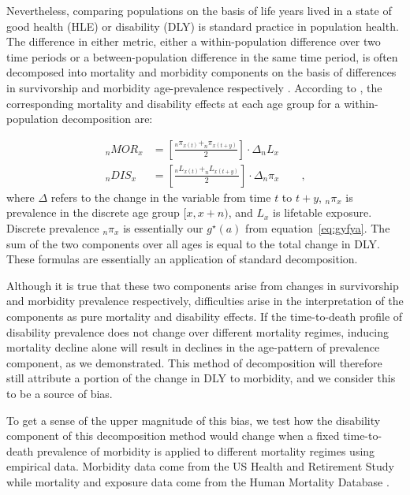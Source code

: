 \documentclass[11pt,oneside,a4paper]{article} %
\newcommand{\tc}{\quad\quad\text{,}}
\begin{document}
Nevertheless, comparing populations on the basis of life years lived in a state
of good health (HLE) or disability (DLY) is standard practice in population
health. The difference in either metric, either a within-population difference
over two time periods or a between-population difference in the same time
period, is often decomposed into mortality and morbidity components on the basis
of differences in survivorship and morbidity age-prevalence respectively
\citep{Nusselder2004,Andreev2002}. According to \citet{Nusselder2004}, the corresponding mortality and disability effects at each age group for a within-population decomposition are:

\begin{align}
	{_{n}{MOR}_{x}}&=\left [ \frac{_{n}\pi_{x\left ( t \right )} + _{n}\pi_{x\left
	( t+y \right )}  }{2}\right ]\cdot \Delta _{n}L_{x} \label{eq:MORcomp}\\
	{_{n}{DIS}_{x}}&=\left [ \frac{_{n}L_{x\left ( t \right )} + _{n}L_{x\left (
	t+y \right )}  }{2}\right ]\cdot \Delta _{n}\pi_{x}	\tc \label{eq:DIScomp}
\end{align}
where $\Delta$ refers to the change in the variable from time $t$ to $t+y$,
$_{n}\pi_x$ is prevalence in the discrete age group $[x,x+n)$, and $L_x$ is
lifetable exposure. Discrete prevalence $_{n}\pi_x$ is essentially our
$g^\star(a)$ from equation~\eqref{eq:gyfya}. The sum of the two components over
all ages is equal to the total change in DLY. These formulas are essentially an
application of standard \citet{kitagawa1955components} decomposition.

Although it is true that these two components arise from changes in survivorship
and morbidity prevalence respectively, difficulties arise in the interpretation
of the components as pure mortality and disability effects. If the time-to-death
profile of disability prevalence does not change over different mortality
regimes, inducing mortality decline alone will result in declines in the
age-pattern of prevalence component, as we demonstrated. This method of
decomposition will therefore still attribute a portion of the
change in DLY to morbidity, and we consider this to be a source of bias.

To get a sense of the upper magnitude of this bias, we test how the disability
component of this decomposition method would change when a fixed time-to-death
prevalence of morbidity is applied to different mortality regimes using empirical data. Morbidity data come from the US Health and Retirement Study while mortality and exposure data come from the Human Mortality Database \citep{HMD2015}.
\end{document}
